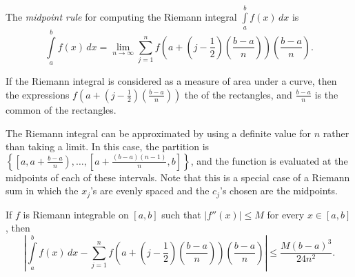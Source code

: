\documentclass[12pt]{article}
\begin{document}
The \emph{midpoint rule} for computing the Riemann integral $\displaystyle \int\limits_a^b f(x) \, dx$ is
\[
\int\limits_a^b f(x) \, dx = \lim_{n \to \infty} \sum_{j=1}^n f \left( a + \left( j-\frac{1}{2} \right) \left( \frac{b-a}{n} \right) \right) \left( \frac{b-a}{n} \right).
\]

If the Riemann integral is considered as a measure of area under a curve, then the expressions $\displaystyle f \left( a + \left( j-\frac{1}{2} \right) \left( \frac{b-a}{n} \right) \right)$  the  of the rectangles, and $\displaystyle \frac{b-a}{n}$ is the common  of the rectangles.

The Riemann integral can be approximated by using a definite value for $n$ rather than taking a limit.  In this case, the partition is $\displaystyle \left\{ \left[ a, a+\frac{b-a}{n} \right) , \dots , \left[ a+\frac{(b-a)(n-1)}{n}, b \right] \right\}$, and the function is evaluated at the midpoints of each of these intervals.  Note that this is a special case of a Riemann sum in which the $x_j$'s are evenly spaced and the $c_j$'s chosen are the midpoints.

If $f$ is Riemann integrable on $[a,b]$ such that $|f''(x)| \le M$ for every $x \in [a,b]$, then
\[
\left| \int\limits_a^b f(x) \, dx - \sum_{j=1}^n f \left( a + \left( j-\frac{1}{2} \right) \left( \frac{b-a}{n} \right) \right) \left( \frac{b-a}{n} \right) \right| \le \frac{M(b-a)^3}{24n^2}.
\]
\end{document}

